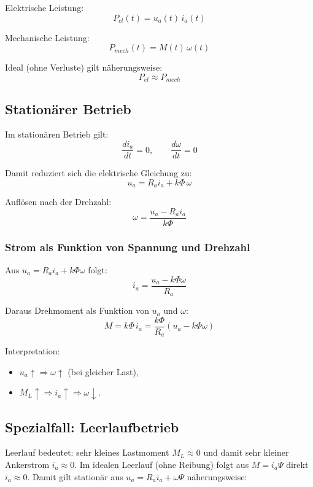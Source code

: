 Elektrische Leistung:
\[
\boxed{P_{el}(t)=u_a(t)\,i_a(t)}
\]

Mechanische Leistung:
\[
\boxed{P_{mech}(t)=M(t)\,\omega(t)}
\]

Ideal (ohne Verluste) gilt näherungsweise:
\[
\boxed{P_{el}\approx P_{mech}}
\]


\subsection{Stationärer Betrieb}

Im stationären Betrieb gilt:
\[
\frac{di_a}{dt}=0,
\qquad
\frac{d\omega}{dt}=0
\]

Damit reduziert sich die elektrische Gleichung zu:
\[
\boxed{u_a = R_a i_a + k\Phi\,\omega}
\]

Auflösen nach der Drehzahl:
\[
\boxed{\omega=\frac{u_a-R_a i_a}{k\Phi}}
\]

\subsubsection{Strom als Funktion von Spannung und Drehzahl}

Aus $u_a=R_a i_a+k\Phi\omega$ folgt:
\[
\boxed{i_a=\frac{u_a-k\Phi\omega}{R_a}}
\]

Daraus Drehmoment als Funktion von $u_a$ und $\omega$:
\[
\boxed{M=k\Phi\,i_a=\frac{k\Phi}{R_a}\left(u_a-k\Phi\omega\right)}
\]

Interpretation:
\begin{itemize}
    \item $u_a\uparrow \Rightarrow \omega\uparrow$ (bei gleicher Last),
    \item $M_L\uparrow \Rightarrow i_a\uparrow \Rightarrow \omega\downarrow$.
\end{itemize}

\subsection{Spezialfall: Leerlaufbetrieb}

Leerlauf bedeutet: sehr kleines Lastmoment $M_L \approx 0$ und damit sehr kleiner Ankerstrom $i_a \approx 0$.
Im idealen Leerlauf (ohne Reibung) folgt aus $M = i_a \Psi$ direkt $i_a \approx 0$.
Damit gilt stationär aus $u_a = R_a i_a + \omega \Psi$ näherungsweise:

